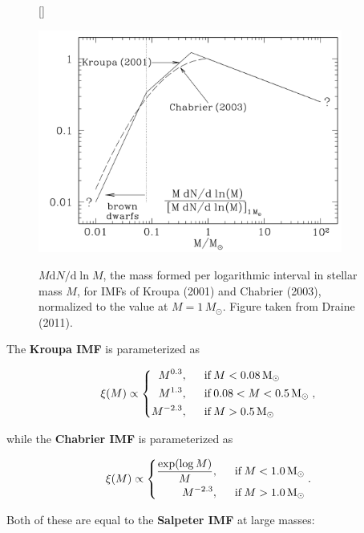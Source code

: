 \documentclass[a4paper,10pt]{article}
\begin{document}
\begin{figure}[h]
    [\FBwidth]
    {\caption{\footnotesize{$M\mathrm{d}N/\mathrm{d}\ln M$, the mass formed per logarithmic interval in stellar mass $M$, for IMFs of Kroupa (2001) and Chabrier (2003), normalized to the value at $M=1\,{M_\odot}$. Figure taken from Draine (2011).}}
    \label{fig:KroupaChabrier}}
    {\includegraphics[width=10cm]{figures/KroupaChabrier.png}}
\end{figure}

{\noindent}The \textbf{Kroupa IMF} is parameterized as

\begin{equation*}
\xi(M) \propto
\left\{
\begin{aligned}
M^{0.3}, ~~~~~& \mathrm{if}\,M<0.08\,{\rm M_\odot} \\
M^{1.3}, ~~~~~& \mathrm{if}\,0.08<M<0.5\,{\rm M_\odot} \\
M^{-2.3}, ~~~~~& \mathrm{if}\,M>0.5\,{\rm M_\odot}
\end{aligned}
\right.
,
\end{equation*}

{\noindent}while the \textbf{Chabrier IMF} is parameterized as

\begin{equation*}
\xi(M) \propto
\left\{
\begin{aligned}
\frac{\exp(\log M)}{M}, ~~~~~& \mathrm{if}\,M<1.0\,{\rm M_\odot} \\
M^{-2.3}, ~~~~~& \mathrm{if}\,M>1.0\,{\rm M_\odot}
\end{aligned}
\right.
.
\end{equation*}

{\noindent}Both of these are equal to the \textbf{Salpeter IMF} at large masses:
\end{document}
